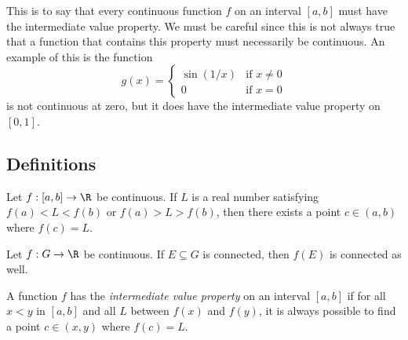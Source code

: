 This is to say that every continuous function \( f \) on an interval \( [a,b] \) must have the intermediate value property. We must be careful since this is not always true that a function that contains this property must necessarily be continuous. An example of this is the function 
\[  g(x) = 
\begin{cases}
    \sin(1/x) &\text{if } x \neq 0 \\
    0 &\text{if } x = 0
\end{cases}  \]
is not continuous at zero, but it does have the intermediate value property on \( [0,1] \). 


\subsection{Definitions}


\begin{tcolorbox}
    \begin{thm}
    Let \( f: [a,b] \to \R  \) be continuous. If \( L  \) is a real number satisfying \( f(a) < L < f(b) \) or \( f(a) > L > f(b) \), then there exists a point \( c \in (a,b) \) where \( f(c) = L  \).
    \end{thm}
\end{tcolorbox}


\begin{tcolorbox}
    \begin{thm}
    Let \( f: G \to \R  \) be continuous. If \( E \subseteq G  \) is connected, then \( f(E) \) is connected as well.
    \end{thm}
\end{tcolorbox}


\begin{tcolorbox}
\begin{defn}
    A function \( f  \) has the \textit{intermediate value property} on an interval \( [a,b] \) if for all \( x < y  \) in \( [a,b] \) and all \( L   \) between \( f(x)  \) and \( f(y) \), it is always possible to find a point \( c \in (x,y) \) where \( f(c) = L  \).
\end{defn}
\end{tcolorbox}

